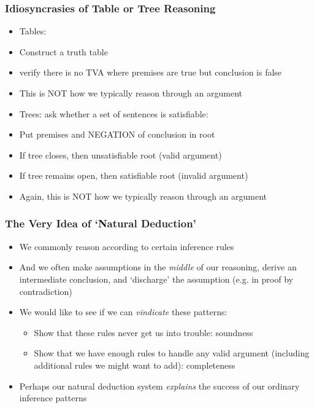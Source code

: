 \begin{frame}
\frametitle{Idiosyncrasies of Table or Tree Reasoning}

\begin{itemize}[<+->]

\item Tables:  

\bi 
\item Construct a truth table

\item verify there is no TVA where premises are true but conclusion is false

\ei 

\item This is NOT how we typically reason through an argument

\item Trees: ask whether a set of sentences is satisfiable:

\bi
\item Put premises and NEGATION of conclusion in root

\item If tree closes, then unsatisfiable root (valid argument)

\item If tree remains open, then satisfiable root (invalid argument)
\ei

\item Again, this is NOT how we typically reason through an argument 

\end{itemize}
\end{frame}

\begin{frame}
\frametitle{The Very Idea of `Natural Deduction'}

\begin{itemize}[<+->]

\item We commonly reason according to certain inference rules

\item And we often make assumptions in the \textit{middle} of our reasoning, derive an intermediate conclusion, and `discharge' the assumption (e.g. in proof by contradiction)

\item We would like to see if we can \textit{vindicate} these patterns:

\begin{itemize}

\item Show that these rules never get us into trouble: soundness

\item Show that we have enough rules to handle any valid argument (including additional rules we might want to add): completeness   

\end{itemize}

\item Perhaps our natural deduction system \textit{explains} the success of our ordinary inference patterns

\end{itemize}
\end{frame}


